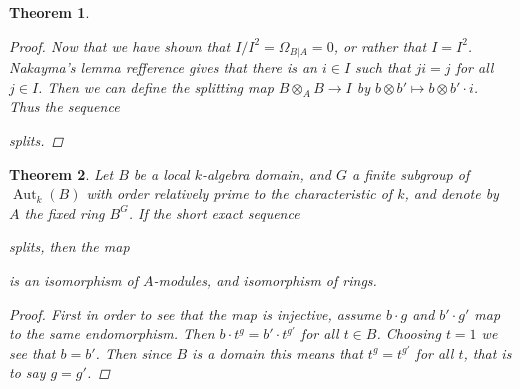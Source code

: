 \documentclass[11pt, a4paper, english]{article}
\numberwithin{prop}{section}
\numberwithin{lemma}{section}
\newtheorem{theorem}{Theorem}
\numberwithin{theorem}{section}
\numberwithin{defin}{section}
\numberwithin{example}{section}
\DeclareMathOperator{\End}{End}
\DeclareMathOperator{\Aut}{Aut}
\begin{document}
\begin{theorem}
\begin{proof}
Now that we have shown that $I/I^2 = \Omega_{B|A} = 0$, or rather that $I = I^2$. Nakayma's lemma {\color{red} refference} gives that there is an $i \in I$ such that $ji = j$ for all $j \in I$. Then we can define the splitting map $B \otimes_A B \to I$ by $b \otimes b' \mapsto b \otimes b' \cdot i$. Thus the sequence 
\begin{center}
\end{center}
splits.
\end{proof}
\end{theorem}

\begin{theorem}
\label{thm:separable_implies_ringiso}
Let $B$ be a local $k$-algebra domain, and $G$ a finite subgroup of $\Aut_k(B)$ with order relatively prime to the characteristic of $k$, and denote by $A$ the fixed ring $B^G$. If the short exact sequence
\begin{center}
\end{center}
splits, then the map
\begin{center}
\end{center}
is an isomorphism of $A$-modules, and isomorphism of rings.

\begin{proof}
First in order to see that the map is injective, assume $b \cdot g$ and $b' \cdot g'$ map to the same endomorphism. Then $b \cdot t^g = b' \cdot t^{g'}$ for all $t \in B$. Choosing $t=1$ we see that $b = b'$. Then since $B$ is a domain this means that $t^g = t^{g'}$ for all $t$, that is to say $g = g'$.


\end{proof}
\end{theorem}
\end{document}
